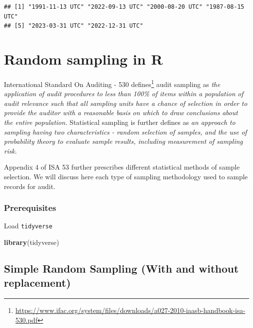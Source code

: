 \documentclass[
]{book}
\newenvironment{Shaded}{\begin{snugshade}}{\end{snugshade}}
\newcommand{\FunctionTok}[1]{\textcolor[rgb]{0.13,0.29,0.53}{\textbf{#1}}}
\newcommand{\NormalTok}[1]{#1}
\begin{document}
\begin{verbatim}
## [1] "1991-11-13 UTC" "2022-09-13 UTC" "2000-08-20 UTC" "1987-08-15 UTC"
## [5] "2023-03-31 UTC" "2022-12-31 UTC"
\end{verbatim}

\hypertarget{random-sampling-in-r}{%
\chapter{Random sampling in R}\label{random-sampling-in-r}}

International Standard On Auditing - 530 defines\footnote{\url{https://www.ifac.org/system/files/downloads/a027-2010-iaasb-handbook-isa-530.pdf}} audit sampling as \emph{the application of audit procedures to less than 100\% of items within a population of audit relevance such that all sampling units have a chance of selection in order to provide the auditor with a reasonable basis on which to draw conclusions about the entire population.} Statistical sampling is further defines as \emph{an approach to sampling having two characteristics - random selection of samples, and the use of probability theory to evaluate sample results, including measurement of sampling risk.}

Appendix 4 of ISA 53 further prescribes different statistical methods of sample selection. We will discuss here each type of sampling methodology used to sample records for audit.

\hypertarget{prerequisites-3}{%
\subsection*{Prerequisites}\label{prerequisites-3}}

Load \texttt{tidyverse}

\begin{Shaded}
\begin{Highlighting}[]
\FunctionTok{library}\NormalTok{(tidyverse)}
\end{Highlighting}
\end{Shaded}

\hypertarget{simple-random-sampling-with-and-without-replacement}{%
\section{Simple Random Sampling (With and without replacement)}\label{simple-random-sampling-with-and-without-replacement}}
\end{document}
